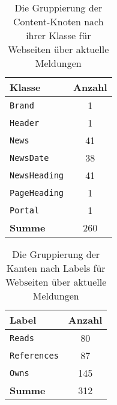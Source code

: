        \begin{table}[!h]
            \centering
            \begin{tabular}{|l|c|}
                \hline
                \textbf{Klasse} & \multicolumn{1}{l|}{\textbf{Anzahl}} \\ \hline
                \texttt{Brand}           & 1                                    \\ \hline
                \texttt{Header}          & 1                                    \\ \hline
                \texttt{News}            & 41                                   \\ \hline
                \texttt{NewsDate}        & 38                                   \\ \hline
                \texttt{NewsHeading}     & 41                                   \\ \hline
                \texttt{PageHeading}     & 1                                    \\ \hline
                \texttt{Portal}          & 1                                    \\ \hline
                \hline
                \textbf{Summe}  & 260                                  \\ \hline
            \end{tabular}
            \caption{Die Gruppierung der Content-Knoten nach ihrer Klasse für Webseiten über aktuelle Meldungen}
            \label{table:findingsNewsFiguresContentNodesByClass}
        \end{table}

        \begin{table}[!h]
            \centering
            \begin{tabular}{|l|c|}
                \hline
                \textbf{Label} & \multicolumn{1}{l|}{\textbf{Anzahl}} \\ \hline
                \texttt{Reads}          & 80                                   \\ \hline
                \texttt{References}     & 87                                   \\ \hline
                \texttt{Owns}           & 145                                  \\ \hline
                \hline
                \textbf{Summe} & 312                                  \\ \hline
                \end{tabular}
            \caption{Die Gruppierung der Kanten nach Labels für Webseiten über aktuelle Meldungen}
            \label{table:findingNewsFiguresEdgesByLabel}
        \end{table}

